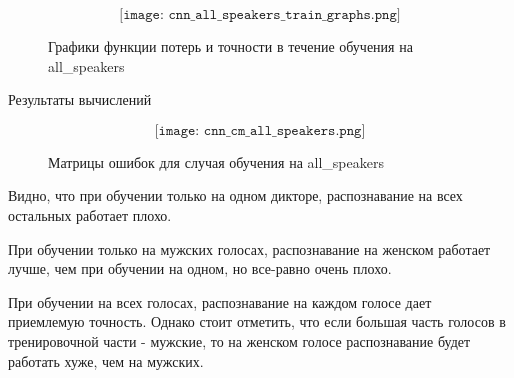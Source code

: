\begin{figure}[H]
  \[\texttt{[image: cnn\_all\_speakers\_train\_graphs.png]}\]
  \caption{Графики функции потерь и точности в течение обучения на all\_speakers}
  \label{fig:cnn_all_speakers_train_graphs}
\end{figure}


\begin{table}[H]
\small
\centering
{}
\caption{Результаты вычислений}
\label{table:test_summary}
\end{table}

\begin{figure}[H]
  \[\texttt{[image: cnn\_cm\_all\_speakers.png]}\]
  \caption{Матрицы ошибок для случая обучения на all\_speakers}
  \label{fig:cnn_cm_all_speakers}
\end{figure}

Видно, что при обучении только на одном дикторе, распознавание на всех остальных работает плохо. 

При обучении только на мужских голосах, распознавание на женском работает лучше, чем при обучении на одном, но все-равно очень плохо.

При обучении на всех голосах, распознавание на каждом голосе дает приемлемую точность. Однако стоит отметить, что если большая часть голосов в тренировочной части - мужские, то на женском голосе распознавание будет работать хуже, чем на мужских.